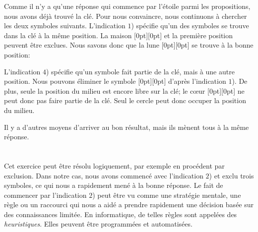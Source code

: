 {{{\centering%
\par}

Comme il n’y a qu’une réponse qui commence par l’étoile parmi les propositions, nous avons déjà trouvé la clé.
Pour nous convaincre, nous continuons à chercher les deux symboles suivants. L’indication $1$) spécifie qu’un des symboles se trouve dans la clé à la même position. La maison \raisebox{-0.5ex}[0pt][0pt]{} et la première position peuvent être exclues. Nous savons donc que la lune \raisebox{-0.5ex}[0pt][0pt]{} se trouve à la bonne position:

{\centering%
\par}

L’indication $4$) spécifie qu’un symbole fait partie de la clé, mais à une autre position. Nous pouvons éliminer le symbole \raisebox{-0.5ex}[0pt][0pt]{} d’après l’indication $1$). De plus, seule la position du milieu est encore libre sur la clé; le cœur \raisebox{-0.5ex}[0pt][0pt]{} ne peut donc pas faire partie de la clé. Seul le cercle peut donc occuper la position du milieu.

{\centering%
\par}

Il y a d’autres moyens d’arriver au bon résultat, mais ils mènent tous à la même réponse.



\section*{\BrochureItsInformatics}
Cet exercice peut être résolu logiquement, par exemple en procédent par exclusion. Dans notre cas, nous avons commencé avec l’indication $2$) et exclu trois symboles, ce qui nous a rapidement mené à la bonne réponse. Le fait de commencer par l’indication $2$) peut être vu comme une stratégie mentale, une règle ou un raccourci qui nous a aidé a prendre rapidement une décision basée sur des connaissances limitée. En informatique, de telles règles sont appelées des \emph{heuristiques}. Elles peuvent être programmées et automatisées.

}}
